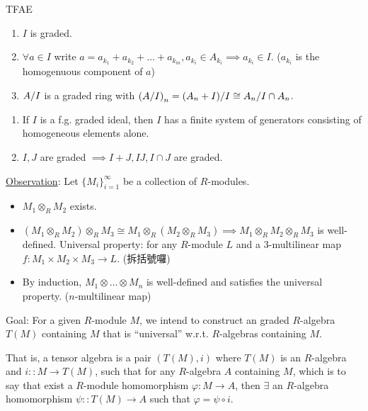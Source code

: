 \begin{exercise}
  TFAE
  \begin{enumerate}[(1)]
    \item $I$ is graded.
    \item $\forall a \in I$ write $a = a_{k_1} + a_{k_2} + \dots + a_{k_m},
      a_{k_i} \in A_{k_i} \implies a_{k_i} \in I$.
      ($a_{k_i}$ is the homogenuous component of $a$)
    \item ${A}/{I}$ is a graded ring with
      $\left({A}/{I}\right)_n = {(A_n + I)}/{I}
      \cong {A_n}/{I \cap A_n}$.
  \end{enumerate}
\end{exercise}

\begin{exercise} \mbox{}
  \begin{enumerate}[(1)]
    \item If $I$ is a f.g. graded ideal, then $I$ has a finite system of
      generators consisting of homogeneous elements alone.
    \item $I, J$ are graded $\implies I+J, IJ, I \cap J$ are graded.
  \end{enumerate}
\end{exercise}

\underline{Observation}:
Let $\{ M_i \}_{i=1}^\infty$ be a collection of $R$-modules.
\begin{itemize}
  \item $M_1 \otimes_R M_2$ exists.
  \item $(M_1 \otimes_R M_2) \otimes_R M_3 \cong
    M_1 \otimes_R (M_2 \otimes_R M_3) \implies
    M_1 \otimes_R M_2 \otimes_R M_3$ is well-defined.
    Universal property: for any $R$-module $L$ and a $3$-multilinear map
    $f: M_1 \times M_2 \times M_3 \to L$. (拆括號囉)
  \item By induction, $M_1 \otimes \dots \otimes M_n$ is well-defined and
    satisfies the universal property. ($n$-multilinear map)
\end{itemize}

Goal: For a given $R$-module $M$, we intend to construct an graded $R$-algebra
$T(M)$ containing $M$ that is ``universal'' w.r.t. $R$-algebras containing $M$.

That is, a tensor algebra is a pair $(T(M), i)$ where $T(M)$ is an $R$-algebra
and $i :: M \to T(M)$, such that for any $R$-algebra $A$ containing $M$,
which is to say that exist a $R$-module homomorphism $\varphi: M \to A$,
then $\exists$ an $R$-algebra homomorphism $\psi :: T(M) \to A$ such
that $\varphi = \psi \circ i$. \\[.5em]

